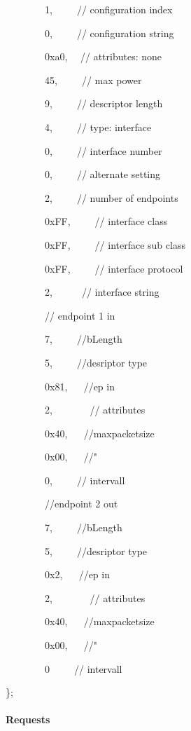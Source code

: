 {~~~~~~~~}{1}{,}{~ ~ ~ }{// configuration index}

{~~~~~~~~}{0}{,}{~ ~ ~ }{// configuration string}

{~~~~~~~~}{0xa0}{,}{~ ~}{// attributes: none}

{~~~~~~~~}{45}{,}{~ ~ ~ }{// max power}

{}

{~~~~~~~~}{9}{,}{~ ~ ~ }{// descriptor length}

{~~~~~~~~}{4}{,}{~ ~ ~ }{// type: interface}

{~~~~~~~~}{0}{,}{~ ~ ~ }{// interface number}

{~~~~~~~~}{0}{,}{~ ~ ~ }{// alternate setting}

{~~~~~~~~}{2}{,}{~ ~ ~ }{// number of endpoints}

{~~~~~~~~}{0xFF}{,}{~ ~ ~ }{// interface class}

{~~~~~~~~}{0xFF}{,}{~ ~ ~ }{// interface sub class}

{~~~~~~~~}{0xFF}{,}{~ ~ ~ }{// interface protocol}

{~~~~~~~~}{2}{,}{~ ~ ~ ~}{// interface string}

{~~~~~~~~}{// endpoint 1 in}

{~~~~~~~~}{7}{,}{~ ~ ~ }{//bLength}

{~~~~~~~~}{5}{,}{~ ~ ~ }{//desriptor type}

{~~~~~~~~}{0x81}{,}{~ ~ }{//ep in}

{~~~~~~~~}{2}{,}{~ ~ ~ ~ ~}{// attributes}

{~~~~~~~~}{0x40}{,}{~ ~ }{//maxpacketsize}

{~~~~~~~~}{0x00}{,}{~ ~ }{//"}

{~~~~~~~~}{0}{,}{~ ~ ~ }{// intervall}

{~~~~~~~~}{//endpoint 2 out}

{~~~~~~~~}{7}{,}{~ ~ ~ }{//bLength}

{~~~~~~~~}{5}{,}{~ ~ ~ }{//desriptor type}

{~~~~~~~~}{0x2}{,}{~ ~ }{//ep in}

{~~~~~~~~}{2}{,}{~ ~ ~ ~ ~}{// attributes}

{~~~~~~~~}{0x40}{,}{~ ~ }{//maxpacketsize}

{~~~~~~~~}{0x00}{,}{~ ~ }{//"}

{~~~~~~~~}{0}{~ ~ ~ }{// intervall}

{\};}

{}

\hypertarget{h.n9ec73ci5cit}{\paragraph{\texorpdfstring{{Requests}}{Requests}}\label{h.n9ec73ci5cit}}

